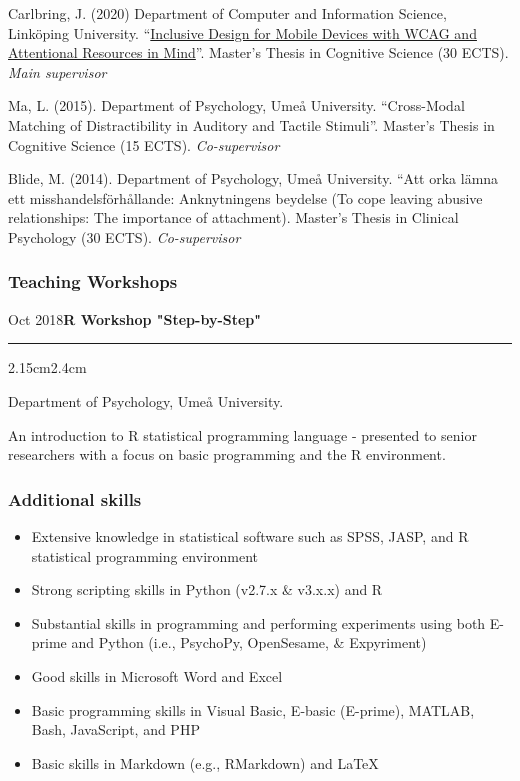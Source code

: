 \documentclass[]{article}
\providecommand{\tightlist}{%
  \setlength{\itemsep}{0pt}\setlength{\parskip}{0pt}}
\begin{document}
Carlbring, J. (2020) Department of Computer and Information Science,
Linköping University.
``\href{http://liu.diva-portal.org/smash/record.jsf?dswid=-6296&faces-redirect=true&language=en&searchType=SIMPLE&query=Marsja&af=\%5B\%5D&aq=\%5B\%5B\%5D\%5D&aq2=\%5B\%5B\%5D\%5D&aqe=\%5B\%5D&pid=diva2\%3A1441358&noOfRows=50&sortOrder=author_sort_asc&sortOrder2=title_sort_asc&onlyFullText=false&sf=undergraduate}{Inclusive
Design for Mobile Devices with WCAG and Attentional Resources in
Mind}''. Master's Thesis in Cognitive Science (30 ECTS). \emph{Main
supervisor}

Ma, L. (2015). Department of Psychology, Umeå University. ``Cross-Modal
Matching of Distractibility in Auditory and Tactile Stimuli''. Master's
Thesis in Cognitive Science (15 ECTS). \emph{Co-supervisor}

Blide, M. (2014). Department of Psychology, Umeå University. ``Att orka
lämna ett misshandelsförhållande: Anknytningens beydelse (To cope
leaving abusive relationships: The importance of attachment). Master's
Thesis in Clinical Psychology (30 ECTS). \emph{Co-supervisor}

\subsubsection{Teaching Workshops}\label{teaching-workshops}

Oct 2018\hspace{0.75cm}\textbf{R Workshop "Step-by-Step"}\vspace{1mm}

\hrule
\begin{changemargin}{2.15cm}{2.4cm}


Department of Psychology, Umeå University.

An introduction to R statistical programming language - presented to senior researchers with a focus on basic programming and the R environment.

\end{changemargin}

\subsubsection{Additional skills}\label{additional-skills}

\begin{itemize}
\tightlist
\item
  Extensive knowledge in statistical software such as SPSS, JASP, and R
  statistical programming environment
\item
  Strong scripting skills in Python (v2.7.x \& v3.x.x) and R
\item
  Substantial skills in programming and performing experiments using
  both E-prime and Python (i.e., PsychoPy, OpenSesame, \& Expyriment)
\item
  Good skills in Microsoft Word and Excel
\item
  Basic programming skills in Visual Basic, E-basic (E-prime), MATLAB,
  Bash, JavaScript, and PHP
\item
  Basic skills in Markdown (e.g., RMarkdown) and \LaTeX
\end{itemize}
\end{document}
